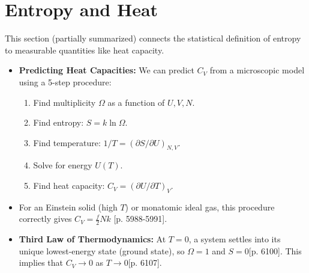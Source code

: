\documentclass[a4paper,oneside,article]{memoir}
\begin{document}
\section{Entropy and Heat}
This section (partially summarized) connects the statistical definition of entropy to measurable quantities like heat capacity.
\begin{itemize}
    \item \textbf{Predicting Heat Capacities:} We can predict $C_V$ from a microscopic model using a 5-step procedure:
    \begin{enumerate}
        \item Find multiplicity $\Omega$ as a function of $U, V, N$.
        \item Find entropy: $S = k \ln \Omega$.
        \item Find temperature: $1/T = (\partial S / \partial U)_{N,V}$.
        \item Solve for energy $U(T)$.
        \item Find heat capacity: $C_V = (\partial U / \partial T)_V$.
    \end{enumerate}
    \item For an Einstein solid (high $T$) or monatomic ideal gas, this procedure correctly gives $C_V = \frac{f}{2}Nk$ [p. 5988-5991].
    \item \textbf{Third Law of Thermodynamics:} At $T=0$, a system settles into its unique lowest-energy state (ground state), so $\Omega=1$ and $S=0$[p. 6100]. This implies that $C_V \to 0$ as $T \to 0$[p. 6107].
\end{itemize}
\end{document}
